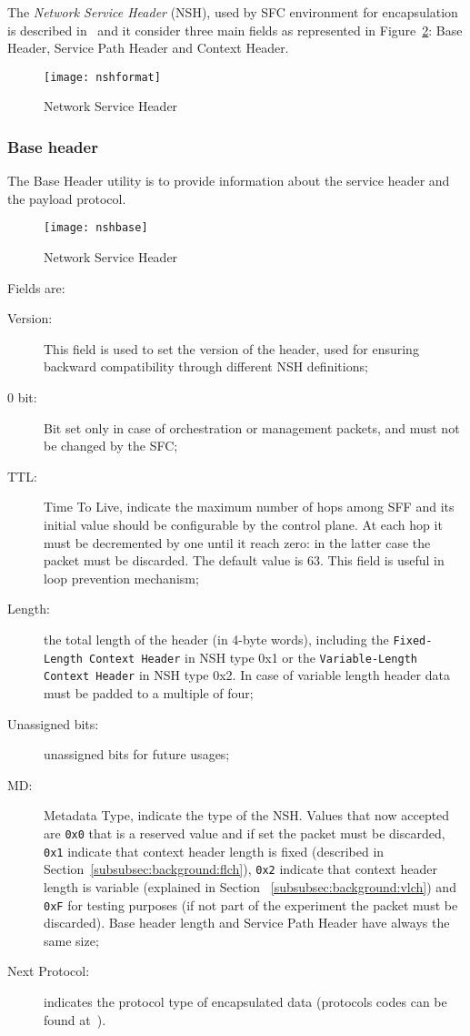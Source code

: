The \emph{Network Service Header} (NSH), used by SFC environment for
encapsulation is described in~\cite{rfc8300} and it consider three main fields
as represented in Figure~\ref{chap:background:img:nshformat}: Base Header,
Service Path Header and Context Header.
\begin{figure}[H]
  \centering
  \texttt{[image: nshformat]}
  \caption[Network Service Header]{Network Service Header~\cite{rfc8300}}
  \label{chap:background:img:nshformat}
\end{figure}

\subsubsection{Base header}
The Base Header utility is to provide information about the service header and
the payload protocol.

\begin{figure}[H]
  \centering
  \texttt{[image: nshbase]}
  \caption[Network Service Header]{Network Service Header~\cite{rfc8300}}
  \label{chap:background:img:nshformat}
\end{figure}

Fields are:
\begin{description}
  \item[Version:] This field is used to set the version of the header, used for
  ensuring backward compatibility through different NSH definitions;
  \item[0 bit:] Bit set only in case of orchestration or management packets, and
  must not be changed by the SFC;
  \item[TTL:] Time To Live, indicate the maximum number of hops among SFF and
  its initial value should be configurable by the control plane. At each hop it
  must be decremented by one until it reach zero: in the latter case the packet
  must be discarded. The default value is $63$. This field is useful in loop
  prevention mechanism;
  \item[Length:] the total length of the header (in 4-byte words), including
  the \texttt{Fixed-Length Context Header} in NSH type 0x1 or the
  \texttt{Variable-Length Context Header} in NSH type 0x2. In case of variable
  length header data must be padded to a multiple of four;
  \item[Unassigned bits:] unassigned bits for future usages;
  \item[MD:] Metadata Type, indicate the type of the NSH. Values that now
  accepted are \texttt{0x0} that is a reserved value and if set the packet must
  be discarded, \texttt{0x1} indicate that context header length is
  fixed (described in Section~\ref{subsubsec:background:flch}), \texttt{0x2}
  indicate that context header length is variable (explained in Section~
  \ref{subsubsec:background:vlch}) and \texttt{0xF} for testing purposes (if
  not part of the experiment the packet must be discarded).
  Base header length and Service Path Header have always the same size;
  \item[Next Protocol:] indicates the protocol type of encapsulated data
  (protocols codes can be found at~\cite{rfc8300}).
\end{description}

